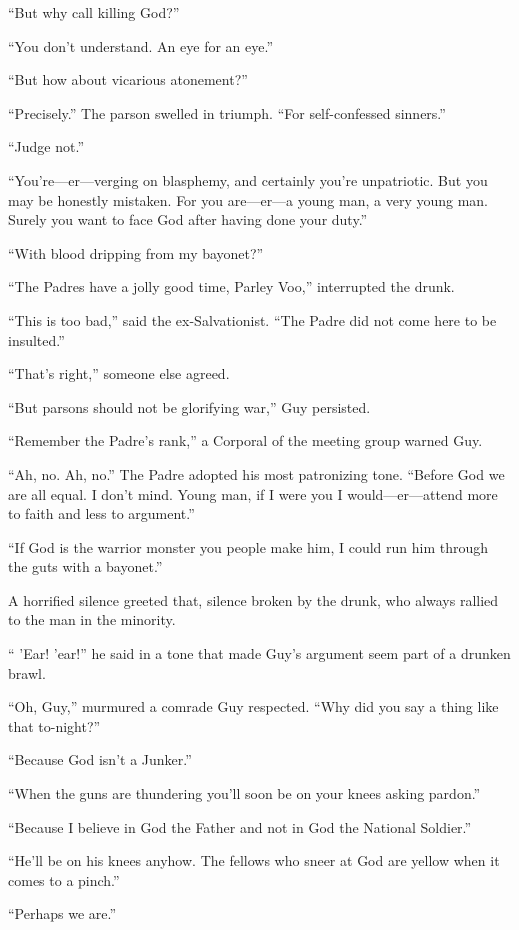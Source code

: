 ``But why call killing God?''

``You don't understand. An eye for an eye.''

``But how about vicarious atonement?''

``Precisely.'' The parson swelled in triumph. ``For self-confessed sinners.''

``Judge not.''

``You're---er---verging on blasphemy, and certainly you're unpatriotic. But you may be honestly mistaken. For you are---er---a young man, a very young man. Surely you want to face God after having done your duty.''

``With blood dripping from my bayonet?''

``The Padres have a jolly good time, Parley Voo,'' interrupted the drunk.

``This is too bad,'' said the ex-Salvationist. ``The Padre did not come here to be insulted.''

``That's right,'' someone else agreed.

``But parsons should not be glorifying war,'' Guy persisted.

``Remember the Padre's rank,'' a Corporal of the meeting group warned Guy.

``Ah, no. Ah, no.'' The Padre adopted his most patronizing tone. ``Before God we are all equal. I don't mind. Young man, if I were you I would---er---attend more to faith and less to argument.''

``If God is the warrior monster you people make him, I could run him through the guts with a bayonet.''

A horrified silence greeted that, silence broken by the drunk, who always rallied to the man in the minority.

`` 'Ear! 'ear!'' he said in a tone that made Guy's argument seem part of a drunken brawl.

``Oh, Guy,'' murmured a comrade Guy respected. ``Why did you say a thing like that to-night?''

``Because God isn't a Junker.''

``When the guns are thundering you'll soon be on your knees asking pardon.''

``Because I believe in God the Father and not in God the National Soldier.''

``He'll be on his knees anyhow. The fellows who sneer at God are yellow when it comes to a pinch.''

``Perhaps we are.''

